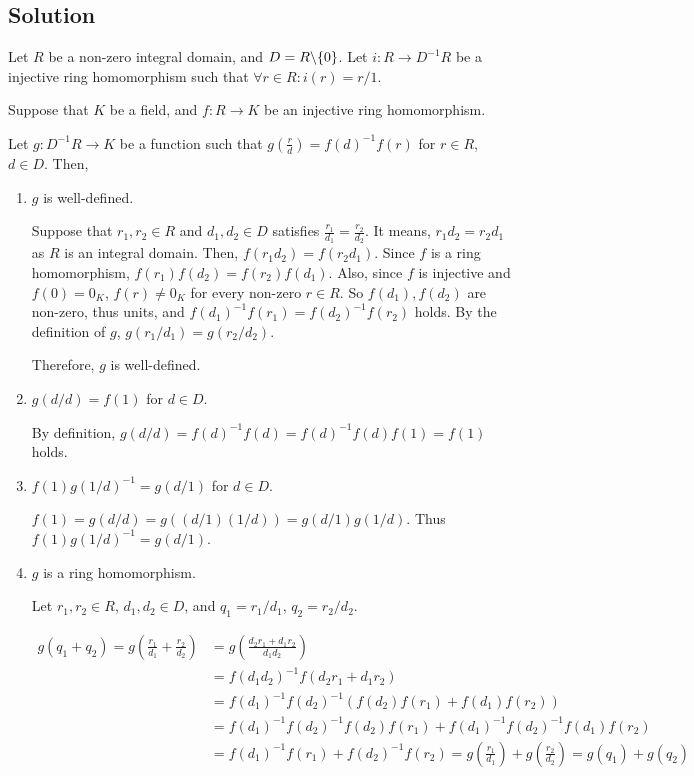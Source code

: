 \documentclass{article}
\newcommand{\bs}{\char`\\}
\begin{document}
\subsection*{Solution}

Let \(R\) be a non-zero integral domain, and \(D = R \bs \{0\}\).
Let \(i: R \to D^{-1}R\) be a injective ring homomorphism such that \(\forall r \in R: i(r) = r/1\).

Suppose that \(K\) be a field, and \(f: R \to K\) be an injective ring homomorphism.

Let \(g: D^{-1}R \to K\) be a function such that \(g\left(\frac{r}{d}\right) = f(d)^{-1}f(r)\) for \(r \in R\), \(d \in D\). Then,
\begin{enumerate}[label=(\roman*)]
\item \(g\) is well-defined.
  
  Suppose that \(r_1, r_2 \in R\) and \(d_1, d_2 \in D\) satisfies \(\frac{r_1}{d_1} = \frac{r_2}{d_2}\).
  It means, \(r_1d_2 = r_2d_1\) as \(R\) is an integral domain.
  Then, \(f(r_1d_2) = f(r_2d_1)\).
  Since \(f\) is a ring homomorphism,
  \(f(r_1)f(d_2) = f(r_2)f(d_1)\).
  Also, since \(f\) is injective and \(f(0) = 0_K\), \(f(r) \neq 0_K\) for every non-zero \(r \in R\).
  So \(f(d_1), f(d_2)\) are non-zero, thus units, and
  \(f(d_1)^{-1}f(r_1) = f(d_2)^{-1}f(r_2)\) holds.
  By the definition of \(g\), \(g(r_1 / d_1) = g(r_2 / d_2)\).

  Therefore, \(g\) is well-defined.

\item \(g(d / d) = f(1)\) for \(d \in D\).

   By definition, \(g(d / d) = f(d)^{-1}f(d) = f(d)^{-1}f(d)f(1) = f(1)\) holds.

\item \(f(1) g(1 / d)^{-1} = g(d / 1)\) for \(d \in D\).

  \(f(1) = g(d / d) = g((d / 1) (1 / d)) = g(d / 1) g(1 / d)\).
  Thus \(f(1) g(1 / d)^{-1} = g(d / 1)\).

\item \(g\) is a ring homomorphism.

  Let \(r_1, r_2 \in R\), \(d_1, d_2 \in D\), and \(q_1 = r_1 / d_1\), \(q_2 = r_2 / d_2\).

  \begin{align*}
    g(q_1 + q_2)
    = g(\frac{r_1}{d_1} + \frac{r_2}{d_2})
    &= g(\frac{d_2 r_1 + d_1 r_2}{d_1 d_2})
    \\&= f(d_1 d_2)^{-1} f(d_2 r_1 + d_1 r_2)
    \\&= f(d_1)^{-1} f(d_2)^{-1} (f(d_2)f(r_1) + f(d_1)f(r_2))
    \\&= f(d_1)^{-1} f(d_2)^{-1} f(d_2)f(r_1) + f(d_1)^{-1} f(d_2)^{-1} f(d_1)f(r_2)
    \\&= f(d_1)^{-1} f(r_1) + f(d_2)^{-1} f(r_2)
    = g(\frac{r_1}{d_1}) + g(\frac{r_2}{d_2})
    = g(q_1) + g(q_2)
  \end{align*}


\end{enumerate}
\end{document}
